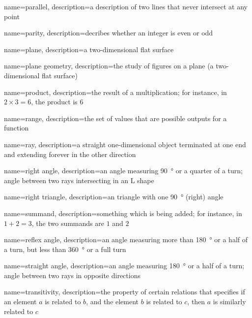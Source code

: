 {
  name=parallel,
  description={a description of two lines that never intersect at any point}
}

{
  name=parity,
  description={decribes whether an integer is even or odd}
}

{
  name=plane,
  description={a two-dimensional flat surface}
}

{
  name=plane geometry,
  description={the study of figures on a plane (a two-dimensional flat surface)}
}

{
  name=product,
  description={the result of a multiplication; for instance, in
  $2\times3=6$, the product is $6$}
}

{
  name=range,
  description={the set of values that are possible outputs for a function}
}

{
  name=ray,
  description={a straight one-dimensional object terminated at one end and
  extending forever in the other direction}
}

{
  name=right angle,
  description={an angle measuring \SI{90}{\degree} or a quarter of a turn; angle
  between two rays intersecting in an L shape}
}

{
  name=right triangle,
  description={an triangle with one \SI{90}{\degree} (right) angle}
}

{
  name=summand,
  description={something which is being added; for instance, in $1+2=3$,
  the two summands are $1$ and $2$}
}

{
  name=reflex angle,
  description={an angle measuring more than \SI{180}{\degree} or a half of a
  turn, but less than \SI{360}{\degree} or a full turn}
}

{
  name=straight angle,
  description={an angle measuring \SI{180}{\degree} or a half of a turn; angle
  between two rays in opposite directions}
}

{
  name=transitivity,
  description={the property of certain relations that specifies if an
  element $a$ is related to $b$, and the element $b$ is related to $c$,
  then $a$ is similarly related to $c$}
}

